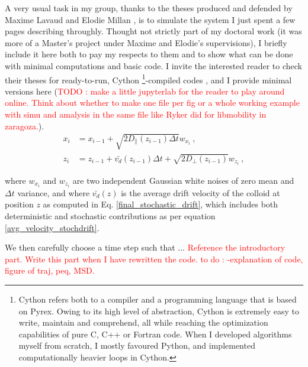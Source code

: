 A very usual task in my group, thanks to the theses produced and defended by Maxime Lavaud \cite{maxime_thesis} and Elodie Millan \cite{elodie_thesis}, is to simulate the system I just spent a few pages describing throughly. Thought not strictly part of my doctoral work (it was more of a Master's project under Maxime and Elodie's supervisions), I briefly include it here both to pay my respects to them and to show what can be done with minimal computations and basic code.
I invite the interested reader to check their theses for ready-to-run, Cython \footnote{Cython refers both to a compiler and a programming language that is based on Pyrex. Owing to its high level of abstraction, Cython is extremely easy to write, maintain and comprehend, all while reaching the optimization capabilities of pure C, C++ or Fortran code. When I developed algorithms myself from scratch, I mostly favoured Python, and implemented computationally heavier loops in Cython.}-compiled codes \cite{cython_website}, and I provide minimal versions here (\textcolor{red}{TODO : make a little jupyterlab for the reader to play around online. Think about whether to make one file per fig or a whole working example with simu and amalysis in the same file like Ryker did for libmobility in zaragoza.}). 
\begin{align}
    x_i & = x_{i-1} + \sqrt{2D_\parallel(z_{i-1})\Delta t} w_{x_i}~,\\
    z_i & = z_{i-1} + \bar{v_d}(z_{i-1}) \Delta t + \sqrt{2D_\perp(z_{i-1})}w_{z_i}~,
\end{align}

where $w_{x_i}$ and $w_{z_i}$ are two independent Gaussian white noises of zero mean and $\Delta t$ variance, and where $\bar{v_d}(z)$ is the average drift velocity of the colloid at position $z$ as computed in Eq. \ref{final_stochastic_drift}, which includes both deterministic and stochastic contributions as per equation \ref{avg_velocity_stochdrift}.

We then carefully choose a time step such that ... \textcolor{red}{Reference the introductory part. Write this part when I have rewritten the code. to do : -explanation of code, figure of traj, peq, MSD.}
